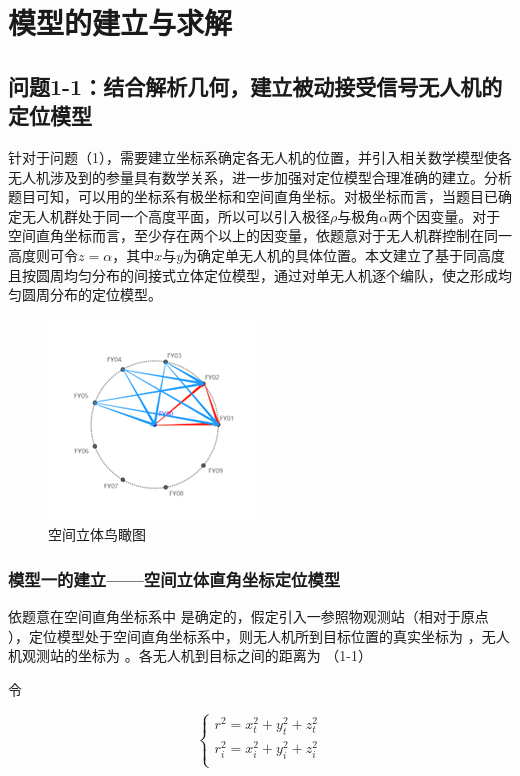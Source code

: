 \section{模型的建立与求解}

\subsection{问题1-1：结合解析几何，建立被动接受信号无人机的定位模型}

针对于问题（1），需要建立坐标系确定各无人机的位置，并引入相关数学模型使各无人机涉及到的参量具有数学关系，进一步加强对定位模型合理准确的建立。分析题目可知，可以用的坐标系有极坐标和空间直角坐标。对极坐标而言，当题目已确定无人机群处于同一个高度平面，所以可以引入极径$\rho$与极角$\alpha$两个因变量。对于空间直角坐标而言，至少存在两个以上的因变量，依题意对于无人机群控制在同一高度则可令$z=\alpha$，其中$x$与$y$为确定单无人机的具体位置。本文建立了基于同高度且按圆周均匀分布的间接式立体定位模型，通过对单无人机逐个编队，使之形成均匀圆周分布的定位模型。

\begin{figure}[h]
    \centering
    \includegraphics{res/AerialView.png}
    \caption{空间立体鸟瞰图}
\end{figure}

\subsubsection{模型一的建立——空间立体直角坐标定位模型}

依题意在空间直角坐标系中 是确定的，假定引入一参照物观测站（相对于原点 ），定位模型处于空间直角坐标系中，则无人机所到目标位置的真实坐标为 ，无人机观测站的坐标为 。各无人机到目标之间的距离为
 （1-1）

令

\begin{equation}
\begin{cases}
    r^2 = x_t^2 + y_t^2 + z_t^2   \\
    r^2_i = x_i^2 + y_i^2 + z_i^2 \\
\end{cases}
\label{e5-081538}
\end{equation}

